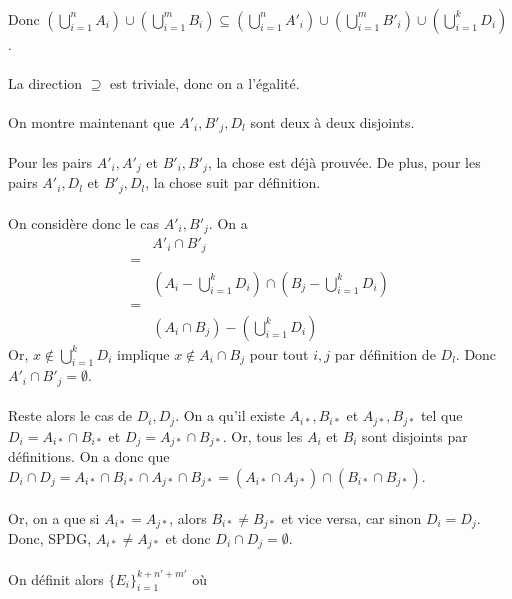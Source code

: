 \documentclass[a4paper,10pt]{article}
\begin{document}
\\
Donc $\left( \bigcup_{i=1}^n A_i \right) \cup \left( \bigcup_{i=1}^m B_i \right) \subseteq \left( \bigcup_{i=1}^n A'_i \right) \cup \left( \bigcup_{i=1}^m B'_i \right) \cup \left( \bigcup_{i=1}^k D_i \right)$. 
\\
\\
La direction $\supseteq$ est triviale, donc on a l'égalité.
\\
\\
On montre maintenant que $A'_i, B'_j, D_l$ sont deux à deux disjoints. 
\\
\\
Pour les pairs $A'_i, A'_j$ et $B'_i, B'_j$, la chose est déjà prouvée. De plus, pour les pairs $A'_i, D_l$ et $B'_j, D_l$, la chose suit par définition.
\\
\\
On considère donc le cas $A'_i, B'_j$. On a 
\begin{align*}
	& A'_i \cap B'_j \\
	= \\
	& \left ( A_i - \bigcup_{i=1}^k D_i \right) \cap \left( B_j - \bigcup_{i=1}^k D_i \right) \\
	= \\
	& (A_i \cap B_j) - \left( \bigcup_{i=1}^k D_i \right)
\end{align*} 
Or, $x \not \in \bigcup_{i=1}^k D_i$ implique $x \not \in A_i \cap B_j$ pour tout $i,j$ par définition de $D_l$. Donc $A'_i \cap B'_j = \emptyset$.
\\
\\
Reste alors le cas de $D_i, D_j$. On a qu'il existe $A_{i*}, B_{i*}$ et $A_{j*}, B_{j*}$ tel que $D_i = A_{i*} \cap B_{i*}$ et $D_j = A_{j*} \cap B_{j*}$. Or, tous les $A_i$ et $B_i$ sont disjoints par définitions. On a donc que $D_i \cap D_j = A_{i*} \cap B_{i*} \cap A_{j*} \cap B_{j*} = (A_{i*} \cap A_{j*}) \cap (B_{i*} \cap B_{j*})$.  
\\
\\
Or, on a que si $A_{i*} = A_{j*}$, alors $B_{i*} \not = B_{j*}$ et vice versa, car sinon $D_i = D_j$. Donc, SPDG, $A_{i*} \not = A_{j*}$ et donc $D_i \cap D_j = \emptyset$. 
\\
\\
On définit alors $\{ E_i \}_{i=1}^{k + n' + m'}$ où 
\end{document}
